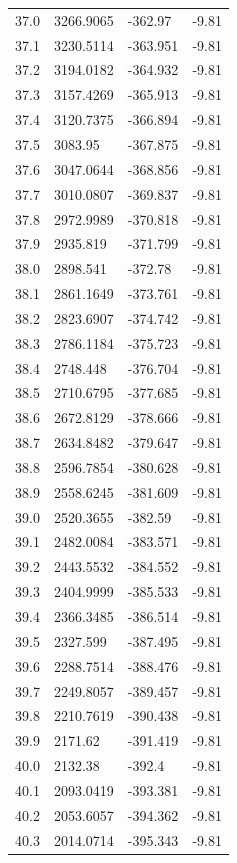 \begin{table}[H]
\begin{tabular}{llll}
37.0 & 3266.9065 & -362.97 & -9.81 \\
37.1 & 3230.5114 & -363.951 & -9.81 \\
37.2 & 3194.0182 & -364.932 & -9.81 \\
37.3 & 3157.4269 & -365.913 & -9.81 \\
37.4 & 3120.7375 & -366.894 & -9.81 \\
37.5 & 3083.95 & -367.875 & -9.81 \\
37.6 & 3047.0644 & -368.856 & -9.81 \\
37.7 & 3010.0807 & -369.837 & -9.81 \\
37.8 & 2972.9989 & -370.818 & -9.81 \\
37.9 & 2935.819 & -371.799 & -9.81 \\
38.0 & 2898.541 & -372.78 & -9.81 \\
38.1 & 2861.1649 & -373.761 & -9.81 \\
38.2 & 2823.6907 & -374.742 & -9.81 \\
38.3 & 2786.1184 & -375.723 & -9.81 \\
38.4 & 2748.448 & -376.704 & -9.81 \\
38.5 & 2710.6795 & -377.685 & -9.81 \\
38.6 & 2672.8129 & -378.666 & -9.81 \\
38.7 & 2634.8482 & -379.647 & -9.81 \\
38.8 & 2596.7854 & -380.628 & -9.81 \\
38.9 & 2558.6245 & -381.609 & -9.81 \\
39.0 & 2520.3655 & -382.59 & -9.81 \\
39.1 & 2482.0084 & -383.571 & -9.81 \\
39.2 & 2443.5532 & -384.552 & -9.81 \\
39.3 & 2404.9999 & -385.533 & -9.81 \\
39.4 & 2366.3485 & -386.514 & -9.81 \\
39.5 & 2327.599 & -387.495 & -9.81 \\
39.6 & 2288.7514 & -388.476 & -9.81 \\
39.7 & 2249.8057 & -389.457 & -9.81 \\
39.8 & 2210.7619 & -390.438 & -9.81 \\
39.9 & 2171.62 & -391.419 & -9.81 \\
40.0 & 2132.38 & -392.4 & -9.81 \\
40.1 & 2093.0419 & -393.381 & -9.81 \\
40.2 & 2053.6057 & -394.362 & -9.81 \\
40.3 & 2014.0714 & -395.343 & -9.81 \\

\end{tabular}
\end{table}
